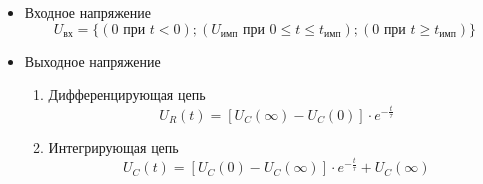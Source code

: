 \begin{itemize}

\item Входное напряжение\\
\begin{equation}
U_\text{вх} = \{(0 \text{ при } t < 0); (U_\text{имп} \text{ при } 0 \leq t \leq t_\text{имп}); (0 \text{ при } t \geq t_\text{имп})\}
\end{equation}

\item Выходное напряжение\\
\begin{enumerate}
\item Дифференцирующая цепь\\
\begin{equation}
U_R(t) = [U_C(\infty) - U_C(0)] \cdot e^{-\frac{t}{\tau}}
\end{equation}

\item Интегрирующая цепь\\
\begin{equation}
U_C(t) = [U_C(0) - U_C(\infty)] \cdot e^{-\frac{t}{\tau}} + U_C(\infty)
\end{equation}

\end{enumerate}
\end{itemize}

